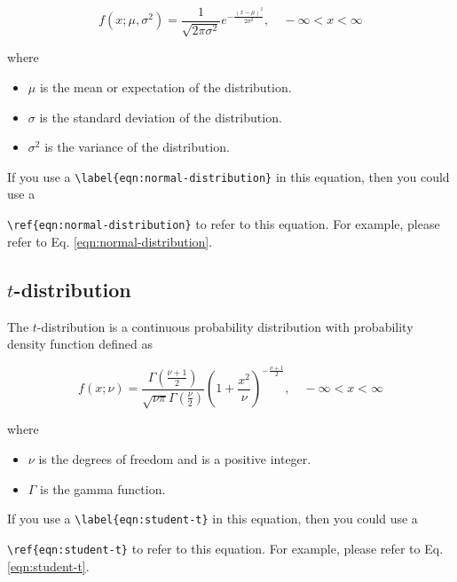 \documentclass[10pt, a4paper, oneside]{article}
\providecommand{\tightlist}{%
  \setlength{\itemsep}{0pt}\setlength{\parskip}{0pt}}
\begin{document}
\begin{equation}\label{eqn:normal-distribution}
f(x ; \mu, \sigma^{2}) = \frac{1}{\sqrt{2\pi\sigma^{2}}}e^{-\frac{\displaystyle (x - \mu)^{2}}{\displaystyle 2\sigma^{2}}}, \quad -\infty < x < \infty
\end{equation}

where

\begin{itemize}
\tightlist
\item
  \(\mu\) is the mean or expectation of the distribution.
\item
  \(\sigma\) is the standard deviation of the distribution.
\item
  \(\sigma^{2}\) is the variance of the distribution.
\end{itemize}

If you use a \texttt{\textbackslash{}label\{eqn:normal-distribution\}} in this equation, then you could use a

\texttt{\textbackslash{}ref\{eqn:normal-distribution\}} to refer to this equation.
For example, please refer to Eq. \ref{eqn:normal-distribution}.

\subsection{\texorpdfstring{\(t\)-distribution}{t-distribution}}\label{t-distribution}

The \(t\)-distribution is a continuous probability distribution with probability density function defined as

\begin{equation}\label{eqn:student-t}
f(x ; \nu) = \frac{\Gamma(\frac{\nu+1}{2})}{\sqrt{\nu\pi}\Gamma(\frac{\nu}{2})}
\left( 1 + \frac{x^{2}}{\nu} \right)^{\displaystyle -\frac{\nu+1}{\displaystyle 2}}
, \quad -\infty < x < \infty
\end{equation}

where

\begin{itemize}
\tightlist
\item
  \(\nu\) is the degrees of freedom and is a positive integer.
\item
  \(\Gamma\) is the gamma function.
\end{itemize}

If you use a \texttt{\textbackslash{}label\{eqn:student-t\}} in this equation, then you could use a

\texttt{\textbackslash{}ref\{eqn:student-t\}} to refer to this equation.
For example, please refer to Eq. \ref{eqn:student-t}.
\end{document}
